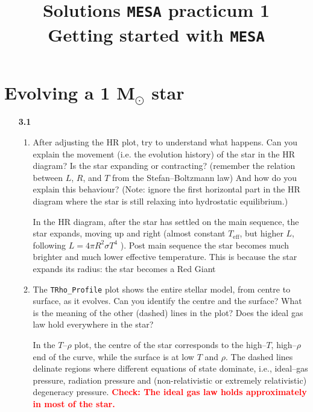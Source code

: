 \documentclass[11pt,a4paper]{article}
\newcommand{\todo}[1]{\textbf{\textcolor{red}{#1}}}
\begin{document}
\title{
    \textbf{Solutions \texttt{MESA} practicum 1} \\
    \textbf{\Large Getting started with \texttt{MESA}}
}
\date{}
\maketitle
\vspace{-1cm}


\section{Evolving a 1 \texorpdfstring{M$_\odot$}{Msun} star}


\begin{enumerate}

\item[\bf{3.1}] 
\begin{enumerate}

\item After adjusting the HR plot, try to understand what happens. Can you explain the movement (i.e. the evolution history) of the star in the HR diagram? Is the star expanding or contracting? (remember the relation between $L$, $R$, and $T$ from the Stefan–Boltzmann law) And how do you explain this behaviour? (Note: ignore the first horizontal part in the HR diagram where the star is still relaxing into hydrostatic equilibrium.)

{\color{blue} In the HR diagram, after the star has settled on the main sequence, the star expands, moving up and right (almost constant $T_{\mathrm{eff}}$, but higher $L$, following $L = 4\pi R^2\sigma T^4$ ). Post main sequence the star becomes much brighter and much lower effective temperature. This is because the star expands its radius: the star becomes a Red Giant}


\item The \verb|TRho_Profile| plot shows the entire stellar model, from centre to surface, as it evolves. Can you identify the centre and the surface? What is the meaning of the other (dashed) lines in the plot? Does the ideal gas law hold everywhere in the star?

{\color{blue} In the $T$–$\rho$ plot, the centre of the star corresponds to the high–$T$, high–$\rho$ end of the curve, while the surface is at low $T$ and $\rho$. The dashed lines delinate regions where different equations of state dominate, i.e., ideal–gas pressure, radiation pressure and (non-relativistic or extremely relativistic) degeneracy pressure. }
\todo{Check: The ideal gas law holds approximately in most of the star.}



\end{enumerate}
\end{enumerate}
\end{document}
